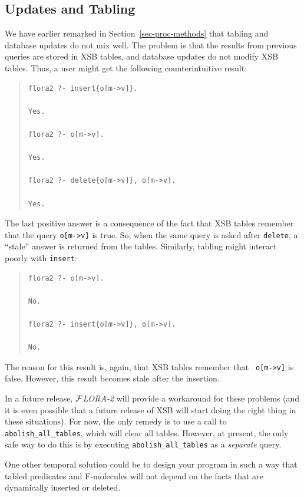 \documentclass[11pt]{article}
\newcommand{\FLORA}{{\mbox{${\cal F}${\small\it LORA}\rm\emph{-2}}}\xspace}
\begin{document}
\subsection{Updates and Tabling}


We have earlier remarked in Section~\ref{sec-proc-methods} that tabling and
database updates do not mix well.  The problem is that the results from
previous queries are stored in XSB tables, and database updates do not
modify XSB tables.  Thus, a user might get the following counterintuitive
result:
\begin{quote}
\begin{verbatim}
flora2 ?- insert{o[m->v]}.

Yes.

flora2 ?- o[m->v].

Yes.

flora2 ?- delete{o[m->v]}, o[m->v].

Yes.
\end{verbatim}
\end{quote}
The last positive answer is a consequence of the fact that XSB tables remember
that the query {\tt o[m->v]} is true. So, when the same query is asked
after {\tt delete}, a ``stale'' answer is returned from the tables. Similarly,
tabling might interact poorly with {\tt insert}:
\begin{quote}
\begin{verbatim}
flora2 ?- o[m->v].

No.

flora2 ?- insert{o[m->v]}, o[m->v].

No.
\end{verbatim}
\end{quote}
The reason for this result is, again, that XSB tables remember that {\tt
  o[m->v]} is false. However, this result becomes stale after the
  insertion.

In a future release, \FLORA will provide a workaround for these
problems (and it is even possible that a future release of XSB will
start doing the right thing in these situations). For now, the only
remedy is to use a call to {\tt abolish\_all\_tables}, which will
clear all tables.  However, at present, the only safe way to do this
is by executing {\tt abolish\_all\_tables} as a \emph{separate} query.

One other temporal solution could be to design your program in such a way
that tabled predicates and F-molecules will not depend on the facts that
are dynamically inserted or deleted.
\end{document}
